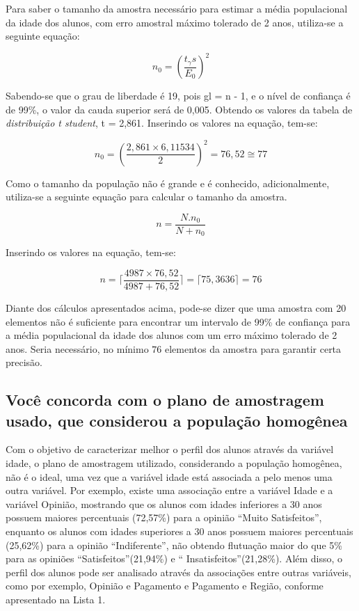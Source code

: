 	Para saber o tamanho da amostra necessário para estimar a média populacional
	da idade dos alunos, com erro amostral máximo tolerado de 2 anos, utiliza-se
	a seguinte equação:

	\begin{equation*}
	  n_0 = \left (\frac{t_\gamma s}{E_0} \right)^2
	\end{equation*}

	Sabendo-se que o grau de liberdade é 19, pois gl = n - 1, e o nível de
	confiança é de 99\%, o valor da cauda superior será de 0,005. Obtendo os
	valores da tabela de \textit{distribuição t student}, t = 2,861. Inserindo
	os valores na equação, tem-se:

	\begin{equation*}
		 n_0 = \left (\frac{2,861 \times 6,11534}{2} \right)^2 = 76,52 \cong 77
	\end{equation*}

	Como o tamanho da população não é grande e é conhecido, adicionalmente,
	utiliza-se a seguinte equação para calcular o tamanho da amostra.

	\begin{equation*}
		 n = \frac{N . n_0}{N + n_0}
	\end{equation*}

	Inserindo os valores na equação, tem-se:

	\begin{equation*}
		 n = \lceil \frac{4987 \times 76,52}{4987 + 76,52} \rceil = \lceil 75,3636 \rceil
		 = 76
	\end{equation*}

	Diante dos cálculos apresentados acima, pode-se dizer que uma amostra
	com 20 elementos não é suficiente para encontrar um intervalo de 99\% de
	confiança para a média populacional da idade dos alunos com um erro
	máximo tolerado de 2 anos. Seria necessário, no mínimo $76$ elementos da
	amostra para garantir certa precisão. 

\subsection{Você concorda com o plano de amostragem usado, que considerou a população homogênea}
Com o objetivo de caracterizar melhor o perfil dos alunos através da variável idade, o plano de amostragem utilizado, considerando a população homogênea, não é o ideal, uma vez que a variável idade 
está associada a pelo menos uma outra variável. Por exemplo, existe uma associação entre a variável Idade e a variável Opinião, mostrando que os alunos com idades inferiores a 30 anos possuem maiores 
percentuais (72,57\%) para a opinião \textquotedblleft Muito Satisfeitos\textquotedblright, enquanto os alunos com idades superiores a 30 anos possuem maiores percentuais (25,62\%) para a opinião 
\textquotedblleft Indiferente\textquotedblright, não obtendo flutuação maior do que 5\% para as opiniões \textquotedblleft Satisfeitos\textquotedblright (21,94\%) e \textquotedblleft 
Insatisfeitos\textquotedblright (21,28\%). Além disso, o perfil dos alunos pode ser analisado através da associações entre outras variáveis, como por exemplo, Opinião e Pagamento e Pagamento e 
Região, conforme apresentado na Lista 1. 

